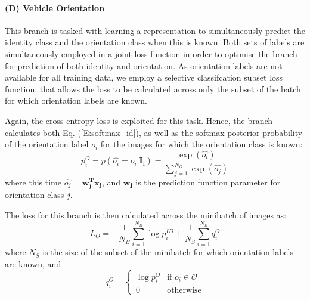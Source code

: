 \documentclass[10pt,twocolumn,letterpaper]{article}
\begin{document}
\paragraph{(D) Vehicle Orientation}

This branch is tasked with learning a representation to simultaneously
predict the identity class and the orientation class when this is known.
Both sets of labels are simultaneously employed in a joint loss function in order to optimise the branch for prediction of both identity and orientation. As orientation labels are not available for all training data, we employ a selective classifcation subset loss function, that allows the loss to be calculated across only the subset of the batch for which orientation labels are known.

Again, the cross entropy loss is exploited for this task. Hence, the branch calculates both Eq. (\ref{E:softmax_id}), as well as the softmax posterior probability of the orientation label $o_i$ for the images for which the orientation class is known:
\begin{equation}
  p_i^{O} = p(\hat{o_i} = o_i|\mathbf{I_i}) = \frac{\exp(\hat{o_i})}{\sum_{j=1}^{N_{O}}\exp(\hat{o_j})}
\end{equation}
where this time $\hat{o_j} = \mathbf{w_j^Tx_j}$, and $\mathbf{w_j}$ is the prediction function parameter for orientation class $\emph{j}$.

The loss for this branch is then calculated across the minibatch of images as:
\begin{equation}
  L_{O} = -\frac{1}{N_B} \sum_{i=1}^{N_B}\log{p_i^{ID}} + \frac{1}{N_S} \sum_{i=1}^{N_B}q_i^O
\end{equation}
where $N_S$ is the size of the subset of the minibatch for which orientation labels are known, and
\[
q_i^O =
\begin{cases}
    \log{p_i^{O}} & \text{if } o_i \in \mathcal{O} \\
    0 & \text{otherwise}
\end{cases}
\]

\end{document}
